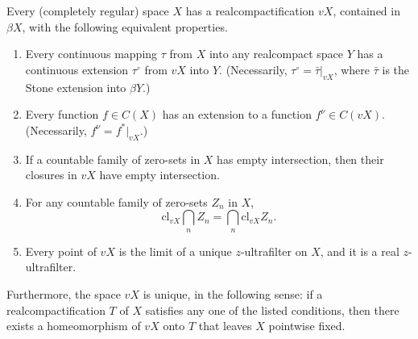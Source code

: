 Every (completely regular) space $X$ has a realcompactification $vX$, contained in $\beta X$, with the following equivalent properties.
\begin{enumerate}
\item[(I)] Every continuous mapping $\tau$ from $X$ into any realcompact space $Y$ has a continuous extension $\tau^\circ$ from $vX$ into $Y$. (Necessarily, $\tau^\circ = \bar{\tau}|_{vX}$, where $\bar{\tau}$ is the Stone extension into $\beta Y$.)
\item[(II)] Every function $f \in C(X)$ has an extension to a function $f^\nu \in C(vX)$. (Necessarily, $f^\nu = f^*|_{vX}$.)
\item[(III)] If a countable family of zero-sets in $X$ has empty intersection, then their closures in $vX$ have empty intersection.
\item[(IV)] For any countable family of zero-sets $Z_n$ in $X$,
  $$\mathrm{cl}_{vX} \bigcap_n Z_n = \bigcap_n \mathrm{cl}_{vX} Z_n.$$
\item[(V)] Every point of $vX$ is the limit of a unique $z$-ultrafilter on $X$, and it is a real $z$-ultrafilter.
\end{enumerate}
Furthermore, the space $vX$ is unique, in the following sense: if a realcompactification $T$ of $X$ satisfies any one of the listed conditions, then there exists a homeomorphism of $vX$ onto $T$ that leaves $X$ pointwise fixed.

